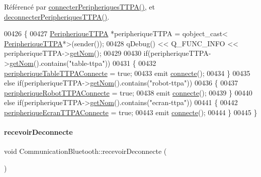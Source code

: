 Référencé par \hyperlink{class_communication_bluetooth_a321073d9dc26aad4b34ecf41a1dee8a4}{connecter\+Peripheriques\+T\+T\+P\+A()}, et \hyperlink{class_communication_bluetooth_aacfffa47d72f3ab5ab554001d5f38fd1}{deconnecter\+Peripheriques\+T\+T\+P\+A()}.


\begin{DoxyCode}
00426 \{
00427     \hyperlink{class_peripherique_t_t_p_a}{PeripheriqueTTPA} *peripheriqueTTPA = qobject\_cast<
      \hyperlink{class_peripherique_t_t_p_a}{PeripheriqueTTPA}*>(sender());
00428     qDebug() << Q\_FUNC\_INFO << peripheriqueTTPA->\hyperlink{class_peripherique_t_t_p_a_abb04680791a7e778ac3808b5d218421f}{getNom}();
00429 
00430     \textcolor{keywordflow}{if}(peripheriqueTTPA->\hyperlink{class_peripherique_t_t_p_a_abb04680791a7e778ac3808b5d218421f}{getNom}().contains(\textcolor{stringliteral}{"table-ttpa"}))
00431     \{
00432         \hyperlink{class_communication_bluetooth_a3b2e75b95ad66dd46d6b1268694c74dc}{peripheriqueTableTTPAConnecte} = \textcolor{keyword}{true};
00433         emit \hyperlink{class_communication_bluetooth_a76f44488775d68071d43b418a7a1c75e}{connecte}();
00434     \}
00435     \textcolor{keywordflow}{else} \textcolor{keywordflow}{if}(peripheriqueTTPA->\hyperlink{class_peripherique_t_t_p_a_abb04680791a7e778ac3808b5d218421f}{getNom}().contains(\textcolor{stringliteral}{"robot-ttpa"}))
00436     \{
00437         \hyperlink{class_communication_bluetooth_a451b47553dd5cf716e8825c0fc0c203b}{peripheriqueRobotTTPAConnecte} = \textcolor{keyword}{true};
00438         emit \hyperlink{class_communication_bluetooth_a76f44488775d68071d43b418a7a1c75e}{connecte}();
00439     \}
00440     \textcolor{keywordflow}{else} \textcolor{keywordflow}{if}(peripheriqueTTPA->\hyperlink{class_peripherique_t_t_p_a_abb04680791a7e778ac3808b5d218421f}{getNom}().contains(\textcolor{stringliteral}{"ecran-ttpa"}))
00441     \{
00442         \hyperlink{class_communication_bluetooth_ace9f69a994a3e9bbaab18ef48ff0f6a3}{peripheriqueEcranTTPAConnecte} = \textcolor{keyword}{true};
00443         emit \hyperlink{class_communication_bluetooth_a76f44488775d68071d43b418a7a1c75e}{connecte}();
00444     \}
00445 \}
\end{DoxyCode}
\mbox{\label{class_communication_bluetooth_af187cbc294befb656070f9817763104b}} 
\paragraph{\texorpdfstring{recevoir\+Deconnecte}{recevoirDeconnecte}}
{\footnotesize\ttfamily void Communication\+Bluetooth\+::recevoir\+Deconnecte (\begin{DoxyParamCaption}{ }\end{DoxyParamCaption})\hspace{0.3cm}{\ttfamily [slot]}}



